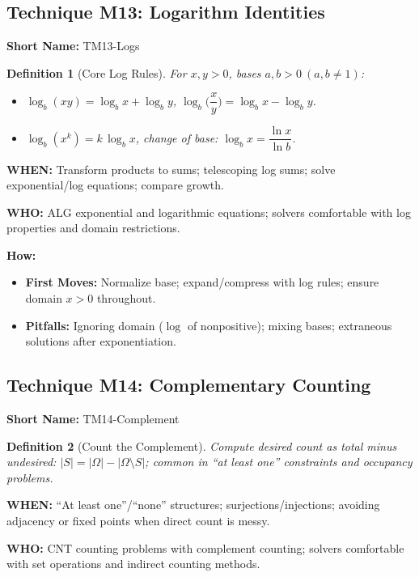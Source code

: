 \documentclass[12pt]{article}
\newtheorem{definition}{Definition}[section]
\begin{document}
\subsection{Technique M13: Logarithm Identities}
\textbf{Short Name:} TM13-Logs

\begin{definition}[Core Log Rules]
For $x,y>0$, bases $a,b>0\ (a,b\ne 1)$:
\begin{itemize}
    \item $\log_b(xy)=\log_b x+\log_b y$, \quad $\log_b\Big(\dfrac{x}{y}\Big)=\log_b x-\log_b y$.
    \item $\log_b(x^k)=k\,\log_b x$, \quad change of base: $\log_b x=\dfrac{\ln x}{\ln b}$.
\end{itemize}
\end{definition}

\textbf{WHEN:} Transform products to sums; telescoping log sums; solve exponential/log equations; compare growth.

\textbf{WHO:} ALG exponential and logarithmic equations; solvers comfortable with log properties and domain restrictions.

\textbf{How:}
\begin{itemize}
    \item \textbf{First Moves:} Normalize base; expand/compress with log rules; ensure domain $x>0$ throughout.
    \item \textbf{Pitfalls:} Ignoring domain ($\log$ of nonpositive); mixing bases; extraneous solutions after exponentiation.
\end{itemize}

\subsection{Technique M14: Complementary Counting}
\textbf{Short Name:} TM14-Complement

\begin{definition}[Count the Complement]
Compute desired count as total minus undesired: $|S|=|\Omega|-|\Omega\setminus S|$; common in ``at least one'' constraints and occupancy problems.
\end{definition}

\textbf{WHEN:} ``At least one''/``none'' structures; surjections/injections; avoiding adjacency or fixed points when direct count is messy.

\textbf{WHO:} CNT counting problems with complement counting; solvers comfortable with set operations and indirect counting methods.
\end{document}
